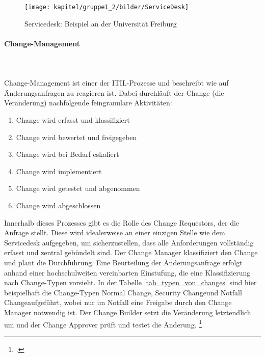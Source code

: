 \begin{figure}[h!]
	\centering
	\texttt{[image: kapitel/gruppe1\_2/bilder/ServiceDesk]}
	\caption{Servicedesk: Beispiel an der Universität Freiburg\protect\footnotemark}
	\label{fig_service_desk}
\end{figure}
\newpage

\paragraph{Change-Management}\mbox{}\\\\
Change-Management ist einer der ITIL-Prozesse und beschreibt wie auf Änderungsanfragen zu reagieren ist. Dabei durchläuft der Change (die Veränderung) nachfolgende feingranulare Aktivitäten:

\begin{enumerate}
	\item Change wird erfasst und klassifiziert
	\item Change wird bewertet und freigegeben
	\item Change wird bei Bedarf eskaliert
	\item Change wird implementiert
	\item Change wird getestet und abgenommen
	\item Change wird abgeschlossen
\end{enumerate}

Innerhalb dieses Prozesses gibt es die Rolle des Change Requestors, der die Anfrage stellt. Diese wird 
idealerweise an einer einzigen Stelle wie dem Servicedesk aufgegeben, um sicherzustellen, dass alle 
Anforderungen vollständig erfasst und zentral gebündelt sind. Der Change Manager klassifiziert den 
Change und plant die Durchführung. Eine Beurteilung der Änderungsanfrage erfolgt anhand einer 
hochschulweiten vereinbarten Einstufung, die eine Klassifizierung nach Change-Typen vorsieht. In der 
Tabelle \ref{tab_typen_von_changes} sind hier beispielhaft die Change-Typen \glqq Normal Change\grqq, \glqq 
Security Change\grqq und \glqq Notfall Change\grqq aufgeführt, wobei nur im Notfall eine 
Freigabe durch den Change Manager notwendig ist. Der Change Builder setzt die Veränderung 
letztendlich um und der Change Approver prüft und testet die Änderung. 
\footcite[Vgl.][48]{breiter_implementierung_2011}

